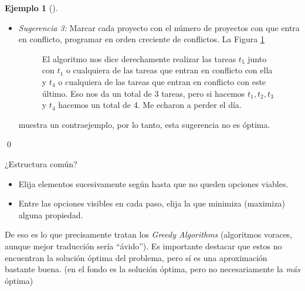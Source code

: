 \documentclass[english, spanish, fleqn, 10pt]{article}
\newcommand{\comillas}[1]{``#1''}
\numberwithin{equation}{section}
\theoremstyle{definition}
\newtheorem{beforeExample}{Ejemplo}[section]
\newenvironment{ejemplo}[1][]{\begin{beforeExample}[#1]\renewcommand{\qedsymbol}{$\blacksquare$}}{\qed\end{beforeExample}}
\begin{document}
\begin{ejemplo}
\begin{itemize}
	 \item \emph{Sugerencia 3:} Marcar cada proyecto con el número de proyectos con que entra en conflicto, programar en orden creciente de conflictos. La Figura \ref{07::Tareas4}
	 \begin{figure}[!h]
	 	\centering
	 	\newcommand{\lineaTarea}[3]{\draw (#1, 0.15+#2) -- (#1, -0.15+#2) -- (#1, #2) -- (#1+#3, #2) -- (#1+#3, 0.15+#2) -- (#1+#3, -0.15+#2)} %
	 	\caption{El algoritmo nos dice derechamente realizar las tareas $t_5$ junto con $t_1$ o cualquiera de las tareas que entran en conflicto con ella y $t_4$ o cualquiera de las tareas que entran en conflicto con este último. Eso nos da un total de $3$ tareas, pero si hacemos $t_1, t_2, t_3$ y $t_4$ hacemos un total de 4. Me echaron a perder el día.}
	 	\label{07::Tareas4}
	 \end{figure}
	 muestra un contraejemplo, por lo tanto, esta sugerencia no es óptima. 
	\end{itemize}
\end{ejemplo}

¿Estructura común?
\begin{itemize}
	\item Elija elementos sucesivamente según hasta que no queden opciones viables.
	
	\item Entre las opciones visibles en cada paso, elija la que minimiza (maximiza) alguna propiedad.
\end{itemize}
De eso es lo que precisamente tratan los \emph{Greedy Algorithms} (algoritmos voraces, aunque mejor traducción sería \comillas{ávido}). Es importante destacar que estos no encuentran la solución óptima del problema, pero sí es una aproximación bastante buena. (en el fondo es la solución óptima, pero no necesariamente la \emph{más} óptima)
\end{document}
